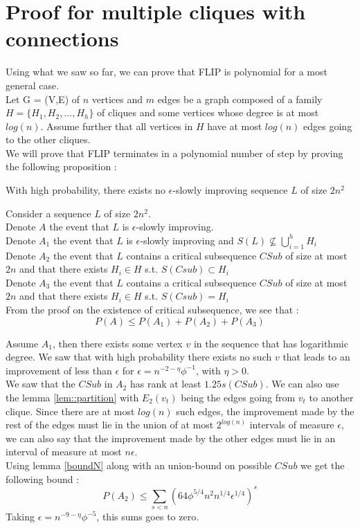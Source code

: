 \section{Proof for multiple cliques with connections}
Using what we saw so far, we can prove that FLIP is polynomial for a most general case. \\
Let G = (V,E) of $n$ vertices and $m$ edges be a graph composed of a family $H = \{H_1, H_2,..., H_h\}$ of cliques and some vertices whose degree is at most $log(n)$. Assume further that all vertices in $H$ have at most $log(n)$ edges going to the other cliques.\\
We will prove that FLIP terminates in a polynomial number of step by proving the following proposition :
\begin{proposition}
With high probability, there exists no $\epsilon$-slowly improving sequence $L$ of size $2n^2$
\end{proposition}

Consider a sequence $L$ of size $2n^2$.\\
Denote $A$ the event that $L$ is $\epsilon$-slowly improving.\\
Denote $A_1$ the event that $L$ is $\epsilon$-slowly improving and $S(L) \not\subseteq \bigcup_{i = 1}^{h}H_i$\\
Denote $A_2$ the event that $L$ contains a critical subsequence $CSub$ of size at most $2n$ and that there exists $H_i \in H$ s.t. $ S(Csub) \subset H_i$ \\
Denote $A_3$ the event that $L$ contains a critical subsequence $CSub$ of size at most $2n$ and that there exists $H_i \in H$ s.t. $ S(Csub) = H_i$\\

From the proof on the existence of critical subsequence, we see that :
\begin{equation*}
P(A) \leq P(A_1) + P(A_2) + P(A_3)
\end{equation*}
 
Assume $A_1$, then there exists some vertex $v$ in the sequence that has logarithmic degree. We saw that with high probability there exists no such $v$ that leads to an improvement of less than $\epsilon$ for $\epsilon = n^{-2-\eta}\phi^{-1}$, with $\eta > 0$.\\

We saw that the $CSub$ in $A_2$ has rank at least $1.25s(CSub)$. We can also use the lemma \ref{lem::partition} with $E_2(v_t)$ being the edges going from $v_t$ to another clique. Since there are at most $log(n)$ such edges, the improvement made by the rest of the edges must lie in the union of at most $2^{log(n)}$ intervals of measure $\epsilon$, we can also say that the improvement made by the other edges must lie in an interval of measure at most $n\epsilon$.\\
Using lemma \ref{boundN} along with an union-bound on possible $CSub$ we get the following bound :
 \begin{equation*}
 P(A_2) \leq \sum_{s<n}(64\phi^{5/4}n^2n^{1/4}\epsilon^{1/4})^s
 \end{equation*}
 Taking $\epsilon = n^{-9-\eta}\phi^{-5}$, this sums goes to zero.\\
 
